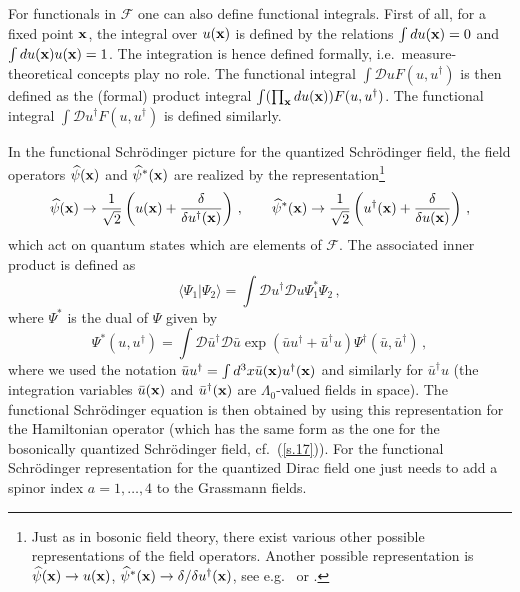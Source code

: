 \documentclass[12pt]{article}
\begin{document}
For functionals in ${\mathcal{F}}$ one can also define functional integrals. First of all, for a fixed point ${\bf x}$, the integral over $u({\bf x})$ is defined by the relations $\int du({\bf x}) =0$ and $\int du({\bf x}) u({\bf x}) =1 $. The integration is hence defined formally, i.e.\ measure-theoretical concepts play no role. The functional integral $\int {\mathcal{D}}u F(u,u^\dagger)$ is then defined as the (formal) product integral $\int (\prod_{{\bf x}} d u({\bf x})) F(u,u^\dagger)$. The functional integral $\int {\mathcal{D}}u^\dagger F(u,u^\dagger)$ is defined similarly.

In the functional Schr{\"o}\-ding\-er picture for the quantized Schr{\"o}\-ding\-er field, the field operators $\widehat{\psi}({\bf x})$ and $\widehat{\psi}^*({\bf x})$ are realized by the representation{\footnote{Just as in bosonic field theory, there exist various other possible representations of the field operators. Another possible representation is $\widehat{\psi}({\bf x}) \to  u({\bf x})$, $\widehat{\psi}^*({\bf x}) \to  \delta / \delta  u^\dagger({\bf x})$,  see e.g.\ \cite[pp.\ 217-223]{hatfield91} or \cite{hallin95}.}}
\begin{equation}
\widehat{\psi}({\bf x}) \to \frac{1}{\sqrt{2}} \left( u({\bf x}) + \frac{ \delta }{ \delta  u^\dagger({\bf x})} \right)\,,\qquad \widehat{\psi}^*({\bf x}) \to \frac{1}{\sqrt{2}}  \left( u^\dagger({\bf x}) + \frac{ \delta }{\delta u({\bf x})}\right)\,,
\label{fv.9}
\end{equation}
which act on quantum states which are elements of ${\mathcal{F}}$. The associated inner product is defined as
\begin{equation}
\langle \Psi_1 | \Psi_2 \rangle = \int \mathcal{D}u^{\dagger} \mathcal{D} u \Psi^*_1 \Psi_2 \,,
\label{fv.7}
\end{equation}
where $\Psi^*$ is the dual of $\Psi$ given by
\begin{equation}
\Psi^*(u,u^{\dagger}) = \int \mathcal{D}{\bar u}^{\dagger} \mathcal{D} {\bar u} \exp({\bar u}u^{\dagger}+ {\bar u}^{\dagger} u) \Psi^{\dagger}({\bar u},{\bar u}^{\dagger})\,,
\label{fv.8}
\end{equation}
where we used the notation ${\bar u} u^{\dagger} = \int d^3 x {\bar u}({\bf x})  u^{\dagger}({\bf x})$ and similarly for ${\bar u}^{\dagger} u$ (the integration variables ${\bar u}({\bf x})$ and ${\bar u}^{\dagger}({\bf x})$ are $\Lambda_0$-valued fields in space). The functional Schr{\"o}\-ding\-er equation is then obtained by using this representation for the Hamiltonian operator (which has the same form as the one for the bosonically quantized Schr{\"o}\-ding\-er field, cf.\ (\ref{s.17})). For the functional Schr{\"o}\-ding\-er representation for the quantized Dirac field one just needs to add a spinor index $a=1,\dots,4$ to the Grassmann fields.
\end{document}
